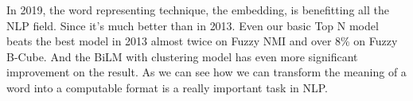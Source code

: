 In 2019, the word representing technique, the embedding, is benefitting all the NLP field. Since it's much better than in 2013. Even our basic Top N model beats the best model in 2013 almost twice on Fuzzy NMI and over 8\% on Fuzzy B-Cube. And the BiLM with clustering model has even more significant improvement on the result. As we can see how we can transform the meaning of a word into a computable format is a really important task in NLP.